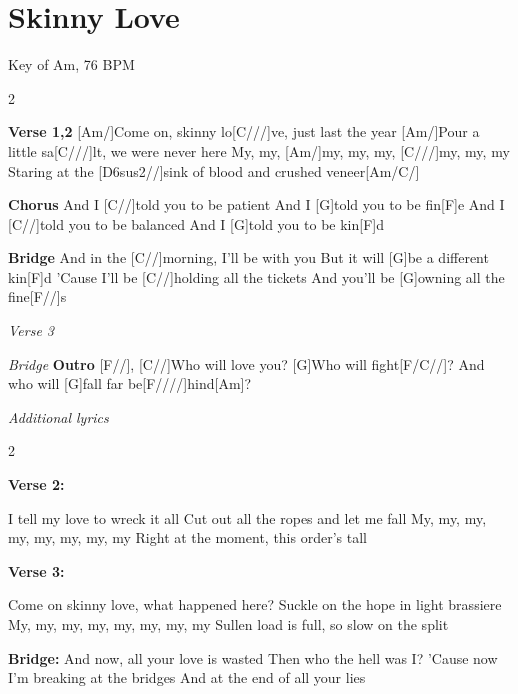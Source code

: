 \documentclass[../../songbookMain]{subfiles}
\begin{document}
\section{Skinny Love}
{\tiny
Key of Am, 76 BPM
}
\begin{guitar}
\begin{multicols}{2}

\textbf{Verse 1,2}
[Am/]Come on, skinny lo[C///]ve, just last the year
[Am/]Pour a little sa[C///]lt, we were never here
My, my, [Am/]my, my, my, [C///]my,  my, my
Staring at the [D6sus2//]sink of blood and crushed veneer[Am/C/]

\textbf{Chorus}
And I [C//]told you to be patient
And I [G]told you to be fin[F]e
And I [C//]told you to be balanced
And I [G]told you to be kin[F]d

\columnbreak

\textbf{Bridge}
And in the [C//]morning, I'll be with you
But it will [G]be a different kin[F]d
'Cause I'll be [C//]holding all the tickets
And you'll be [G]owning all the fine[F//]s

\textit{Verse 3}

\textit{Bridge}
\textbf{Outro}
[F//],
[C//]Who will love you?
[G]Who will fight[F/C//]?
And who will [G]fall
far be[F////]hind[Am]?

\end{multicols}

\begin{center}
\textit{Additional lyrics}
\end{center}
\begin{multicols}{2}
\footnotesize
\raggedright
\textbf{Verse 2:}

I tell my love to wreck it all
Cut out all the ropes and let me fall
My, my, my, my, my, my, my, my
Right at the moment, this order's tall

\textbf{Verse 3:}

Come on skinny love, what happened here?
Suckle on the hope in light brassiere
My, my, my, my, my, my, my, my
Sullen load is full, so slow on the split

\columnbreak

\textbf{Bridge:}
And now, all your love is wasted
Then who the hell was I?
'Cause now I'm breaking at the bridges
And at the end of all your lies
\end{multicols}
\end{guitar}
\end{document}
